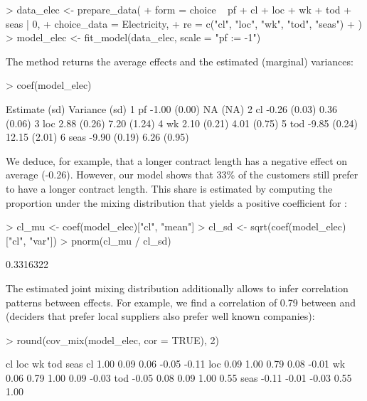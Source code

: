 \documentclass[article,shortnames]{jss}
\newcommand{\fct}[1]{\code{#1()}}
\begin{document}
\begin{Schunk}
\begin{Sinput}
> data_elec <- prepare_data(
+    form = choice ~ pf + cl + loc + wk + tod + seas | 0,
+    choice_data = Electricity,
+    re = c("cl", "loc", "wk", "tod", "seas")
+  )
> model_elec <- fit_model(data_elec, scale = "pf := -1")
\end{Sinput}
\end{Schunk}

The \fct{coef} method returns the average effects and the estimated (marginal) variances:

\begin{Schunk}
\begin{Sinput}
> coef(model_elec)
\end{Sinput}
\begin{Soutput}
        Estimate   (sd) Variance   (sd)
1   pf     -1.00 (0.00)       NA   (NA)
2   cl     -0.26 (0.03)     0.36 (0.06)
3  loc      2.88 (0.26)     7.20 (1.24)
4   wk      2.10 (0.21)     4.01 (0.75)
5  tod     -9.85 (0.24)    12.15 (2.01)
6 seas     -9.90 (0.19)     6.26 (0.95)
\end{Soutput}
\end{Schunk}

We deduce, for example, that a longer contract length has a negative effect on average (-0.26). However, our model shows that 33\% of the customers still prefer to have a longer contract length. This share is estimated by computing the proportion under the mixing distribution that yields a positive coefficient for :

\begin{Schunk}
\begin{Sinput}
> cl_mu <- coef(model_elec)["cl", "mean"]
> cl_sd <- sqrt(coef(model_elec)["cl", "var"])
> pnorm(cl_mu / cl_sd)
\end{Sinput}
\begin{Soutput}
[1] 0.3316322
\end{Soutput}
\end{Schunk}

The estimated joint mixing distribution additionally allows to infer correlation patterns between effects. For example, we find a correlation of 0.79 between  and  (deciders that prefer local suppliers also prefer well known companies):

\begin{Schunk}
\begin{Sinput}
> round(cov_mix(model_elec, cor = TRUE), 2)
\end{Sinput}
\begin{Soutput}
        cl   loc    wk   tod  seas
cl    1.00  0.09  0.06 -0.05 -0.11
loc   0.09  1.00  0.79  0.08 -0.01
wk    0.06  0.79  1.00  0.09 -0.03
tod  -0.05  0.08  0.09  1.00  0.55
seas -0.11 -0.01 -0.03  0.55  1.00
\end{Soutput}
\end{Schunk}
\end{document}
